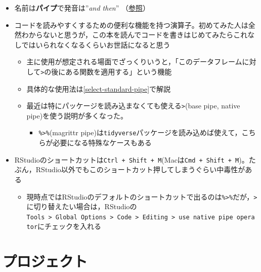 \documentclass[
  xelatex,ja=standard, b5paper]{bxjsbook}
\providecommand{\tightlist}{%
  \setlength{\itemsep}{0pt}\setlength{\parskip}{0pt}}
\begin{document}
\begin{itemize}
\tightlist
\item
  名前は\textbf{パイプ}で発音は''\emph{and then}'' （\href{https://adv-r.hadley.nz/functions.html\#function-composition}{参照}）
\item
  コードを読みやすくするための便利な機能を持つ演算子。初めてみた人は全然わからないと思うが，この本を読んでコードを書きはじめてみたらこれなしではいられなくなるくらいお世話になると思う

  \begin{itemize}
  \tightlist
  \item
    主に使用が想定される場面でざっくりいうと，「このデータフレームに対して\texttt{\textbar{}\textgreater{}}の後にある関数を適用する」という機能
  \item
    具体的な使用法は\ref{select-standard-pipe}で解説
  \item
    最近は特にパッケージを読み込まなくても使える\texttt{\textbar{}\textgreater{}}(base pipe, native pipe)を使う説明が多くなった。

    \begin{itemize}
    \tightlist
    \item
      \texttt{\%\textgreater{}\%}(magrittr pipe)は\texttt{tidyverse}パッケージを読み込めば使えて，こちらが必要になる特殊なケースもある
    \end{itemize}
  \end{itemize}
\item
  RStudioのショートカットは\texttt{Ctrl\ +\ Shift\ +\ M}(Macは\texttt{Cmd\ +\ Shift\ +\ M})。たぶん，RStudio以外でもこのショートカット押してしまうぐらい中毒性がある

  \begin{itemize}
  \tightlist
  \item
    現時点ではRStudioのデフォルトのショートカットで出るのは\texttt{\%\textgreater{}\%}だが，\texttt{\textbar{}\textgreater{}}に切り替えたい場合は，RStudioの\texttt{Tools\ \textgreater{}\ Global\ Options\ \textgreater{}\ Code\ \textgreater{}\ Editing\ \textgreater{}\ use\ native\ pipe\ operator}にチェックを入れる
  \end{itemize}
\end{itemize}

\hypertarget{p-project}{%
\section{プロジェクト}\label{p-project}}
\end{document}
